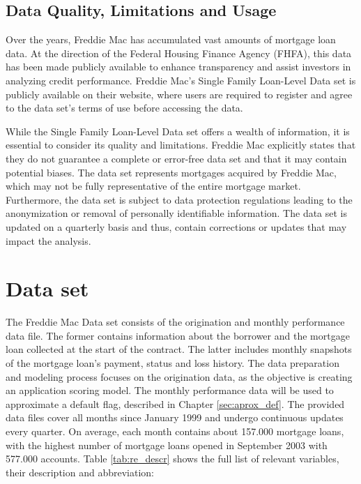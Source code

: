 \subsection{Data Quality, Limitations and Usage}

Over the years, Freddie Mac has accumulated vast amounts of mortgage loan data. At the direction of the Federal Housing Finance Agency (FHFA), this data has been made publicly available to enhance transparency and assist investors in analyzing credit performance. Freddie Mac's Single Family Loan-Level Data set is publicly available on their website, where users are required to register and agree to the data set's terms of use before accessing the data. \cite{FreddieMacData:2023}

While the Single Family Loan-Level Data set offers a wealth of information, it is essential to consider its quality and limitations. Freddie Mac explicitly states  that they do not guarantee a complete or error-free data set and that it may contain potential biases. The data set represents mortgages acquired by Freddie Mac, which may not be fully representative of the entire mortgage market. Furthermore, the data set is subject to data protection regulations leading to the anonymization or removal of personally identifiable information. The data set is updated on a quarterly basis and thus, contain corrections or updates that may impact the analysis. \cite{FreddieMacUG:2023}


\section{Data set}

The Freddie Mac Data set consists of the origination and monthly performance data file. The former contains information about the borrower and the mortgage loan collected at the start of the contract. The latter includes monthly snapshots of the mortgage loan's payment, status and loss history. The data preparation and modeling process focuses on the origination data, as the objective is creating an application scoring model. The monthly performance data will be used to approximate a default flag, described in Chapter \ref{sec:aprox_def}. The provided data files cover all months since January 1999 and undergo continuous updates every quarter. On average, each month contains about 157.000 mortgage loans, with the highest number of mortgage loans opened in September 2003 with 577.000 accounts. Table \ref{tab:re_descr} shows the full list of relevant variables, their description and abbreviation:

